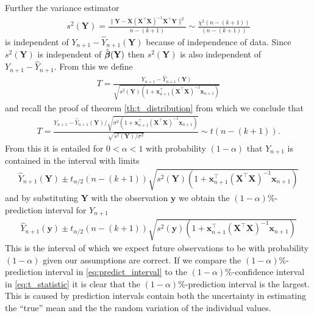 Further the variance estimator
\begin{align*}
    s^2(\textbf{Y})=\frac{\|\textbf{Y} - \textbf{X}( \textbf{X}^\top\textbf{X} )^{-1}\textbf{X}^\top\textbf{Y}\|^2}{n-(k+1)} \sim \frac{\chi^2(n-(k+1))}{(n-(k+1))}
\end{align*}
is independent of $Y_{n+1}-\hat{Y}_{n+1}(\textbf{Y})$ because of independence of data.
Since $s^2(\textbf{Y})$ is independent of $\hat{\operatorname{\boldsymbol{\beta}}}(\textbf{Y})$ then $s^2(\textbf{Y})$ is also independent of $Y_{n+1}-\hat{Y}_{n+1}$.
From this we define
\begin{align*}
    T=\frac{Y_{n+1}-\hat{Y}_{n+1}(\textbf{Y})}{\sqrt{s^2(\textbf{Y})(1+\textbf{x}^\top_{n+1}(\textbf{X}^\top\textbf{X})^{-1}\textbf{x}_{n+1})}}
\end{align*}
and recall the proof of theorem \ref{th:t_distribution} from which we conclude that
\begin{align*}
    T=\frac{Y_{n+1}-\hat{Y}_{n+1}(\textbf{Y})/\sqrt{\sigma^2(1+\textbf{x}^\top_{n+1}(\textbf{X}^\top\textbf{X})^{-1}\textbf{x}_{n+1})}}{\sqrt{s^2(\textbf{Y})/\sigma^2}} \sim t(n-(k+1)).
\end{align*}
From this it is entailed for $0<\alpha<1$ with probability $(1-\alpha)$ that $Y_{n+1}$ is contained in the interval with limits
\begin{align*}
    \hat{Y}_{n+1}(\textbf{Y})\pm t_{\alpha/2}(n-(k+1))\sqrt{s^2(\textbf{Y})(1+\textbf{x}^\top_{n+1}(\textbf{X}^\top\textbf{X})^{-1}\textbf{x}_{n+1})}
\end{align*}
and by substituting $\textbf{Y}$ with the observation $\textbf{y}$ we obtain the $(1-\alpha)\%$-prediction interval for $Y_{n+1}$
\begin{align} \label{eq:predict_interval}
    \hat{Y}_{n+1}(\textbf{y})\pm t_{\alpha/2}(n-(k+1))\sqrt{s^2(\textbf{y})(1+\textbf{x}^\top_{n+1}(\textbf{X}^\top\textbf{X})^{-1}\textbf{x}_{n+1})}
\end{align}
This is the interval of which we expect future observations to be with probability $(1-\alpha)$ given our assumptions are correct.
If we compare the $(1-\alpha)\%$-prediction interval in \eqref{eq:predict_interval} to the $(1-\alpha)\%$-confidence interval in \eqref{eq:t_statistic} it is clear that the $(1-\alpha)\%$-prediction interval is the largest.
This is caused by prediction intervals contain both the uncertainty in estimating the ``true'' mean and the the random variation of the individual values.
